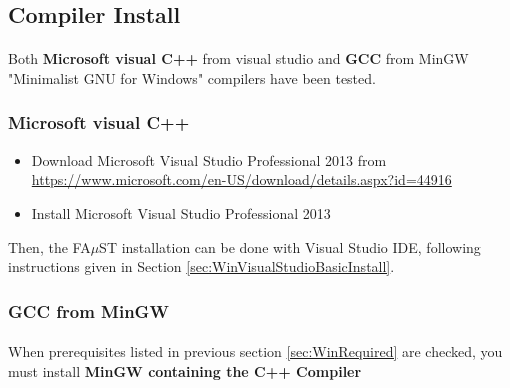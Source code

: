 \subsection{Compiler Install}\label{sec:WinInstallCompiler}
\paragraph{}Both \textbf{Microsoft visual C++} from visual studio and \textbf{GCC} from MinGW "Minimalist GNU for Windows" compilers have been tested. 


\subsubsection{Microsoft visual C++}\label{sec:WinInstallCompilerVS} \begin{itemize}
\item Download Microsoft Visual Studio Professional 2013 from \url{https://www.microsoft.com/en-US/download/details.aspx?id=44916}
\item Install Microsoft Visual Studio Professional 2013
\end{itemize}
Then, the FA$\mu$ST installation can be done with Visual Studio IDE, following instructions given in Section \ref{sec:WinVisualStudioBasicInstall}. 


\subsubsection{GCC from MinGW}
\label{sec:WinInstallCompilerMinGW}

\paragraph{}When prerequisites listed in previous section \ref{sec:WinRequired} are checked, you must install \textbf{MinGW containing the C++ Compiler}

